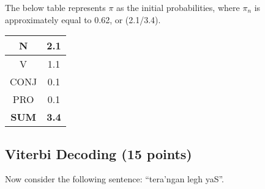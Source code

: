 \documentclass[11pt]{article}
\begin{document}
The below table represents \(\pi\) as the initial probabilities, where  \(\pi_n \) is approximately equal to 0.62, or (2.1/3.4).

\begin{center}
\begin{tabular}{|c|c|}
\hline
N     &  2.1 \\
\hline
V     &  1.1 \\
\hline
CONJ  & 0.1 \\
\hline
PRO   & 0.1 \\
\hline
\textbf{SUM}   & \textbf{3.4} \\
\hline
\end{tabular}
\end{center}

\subsection{Viterbi Decoding (15 points)}

Now consider the following sentence: ``tera'ngan legh yaS''.
\end{document}

